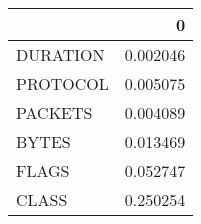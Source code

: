 \begin{tabular}{lr}
\toprule
{} &         0 \\
\midrule
DURATION &  0.002046 \\
PROTOCOL &  0.005075 \\
PACKETS  &  0.004089 \\
BYTES    &  0.013469 \\
FLAGS    &  0.052747 \\
CLASS    &  0.250254 \\
\bottomrule
\end{tabular}
